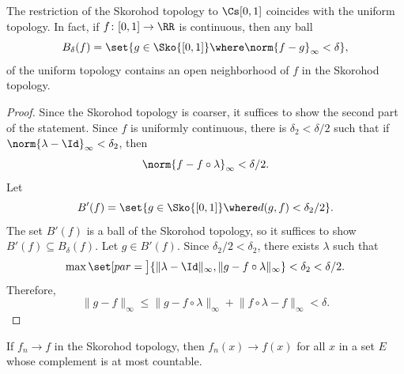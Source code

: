 \documentclass[../main]{subfiles}
\begin{document}
\begin{proposition}\label{prop:skorohod-uniform}
  The restriction of the Skorohod topology to \(\CWPS\) coincides with the uniform topology. In fact, if \(f \colon [0,1] \to \RR\) is continuous, then any ball \[B_{\delta}(f) = \set{g \in \Sko{[0,1]} \where \norm{f - g}_{\infty} < \delta},\] of the uniform topology contains an open neighborhood of \(f\) in the Skorohod topology.
\end{proposition}
\begin{proof}
  Since the Skorohod topology is coarser, it suffices to show the second part of the statement. Since \(f\) is uniformly continuous, there is \(\delta_2 < \delta/2\) such that if \(\norm{\lambda - \Id}_{\infty} < \delta_2\), then
  \begin{equation*}
    \norm{f - f \circ \lambda}_{\infty} < \delta/2.
  \end{equation*}
  Let \[B'(f) = \set{g \in \Sko{[0,1]} \where d(g,f) < \delta_2/2}.\] The set \(B'(f)\) is a ball of the Skorohod topology, so it suffices to show \(B'(f) \subseteq B_{\delta}(f)\). Let \(g \in B'(f)\). Since \(\delta_2/2 < \delta_2\), there exists \(\lambda\) such that 
  \begin{equation*}
    \max\set[par = \big]{ \lVert \lambda - \Id \rVert_{\infty}, \lVert g - f \circ \lambda \rVert_{\infty}} < \delta_2 < \delta/2.
  \end{equation*}
  Therefore,
  \begin{equation*}
    \lVert g - f \rVert_{\infty} \leq \lVert g - f \circ \lambda \rVert_{\infty} +  \lVert f \circ \lambda - f \rVert_{\infty} < \delta.
  \end{equation*}
\end{proof}

\begin{proposition}\label{prop:sko-conv-pointwise}
  If \(f_n \to f\) in the Skorohod topology, then \(f_n(x) \to f(x)\) for all \(x\) in a set \(E\) whose complement is at most countable.
\end{proposition}
\end{document}
